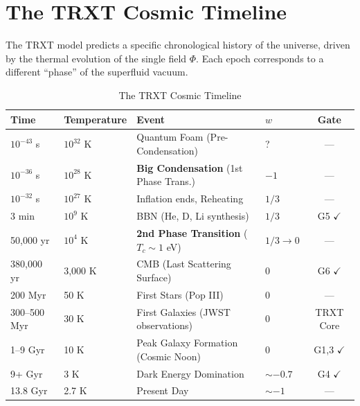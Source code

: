 \documentclass[a4paper,12pt]{article}
\begin{document}
\section{The TRXT Cosmic Timeline}

The TRXT model predicts a specific chronological history of the universe, driven by the thermal evolution of the single field $\Phi$. Each epoch corresponds to a different ``phase'' of the superfluid vacuum.

\begin{table}[H]
\centering
\caption{The TRXT Cosmic Timeline}
\label{tab:timeline}
\begin{tabular}{@{}llllc@{}}
\toprule
\textbf{Time} & \textbf{Temperature} & \textbf{Event} & \textbf{$w$} & \textbf{Gate} \\
\midrule
$10^{-43}$ s & $10^{32}$ K & Quantum Foam (Pre-Condensation) & ? & --- \\
$10^{-36}$ s & $10^{28}$ K & \textbf{Big Condensation} (1st Phase Trans.) & $-1$ & --- \\
$10^{-32}$ s & $10^{27}$ K & Inflation ends, Reheating & $1/3$ & --- \\
3 min & $10^{9}$ K & BBN (He, D, Li synthesis) & $1/3$ & G5 $\checkmark$ \\
50,000 yr & $10^{4}$ K & \textbf{2nd Phase Transition} ($T_c \sim 1$ eV) & $1/3 \to 0$ & --- \\
380,000 yr & 3,000 K & CMB (Last Scattering Surface) & 0 & G6 $\checkmark$ \\
200 Myr & 50 K & First Stars (Pop III) & 0 & --- \\
300--500 Myr & 30 K & First Galaxies (JWST observations) & 0 & TRXT Core \\
1--9 Gyr & 10 K & Peak Galaxy Formation (Cosmic Noon) & 0 & G1,3 $\checkmark$ \\
9+ Gyr & 3 K & Dark Energy Domination & $\sim -0.7$ & G4 $\checkmark$ \\
13.8 Gyr & 2.7 K & Present Day & $\sim -1$ & --- \\
\bottomrule
\end{tabular}
\end{table}
\end{document}
